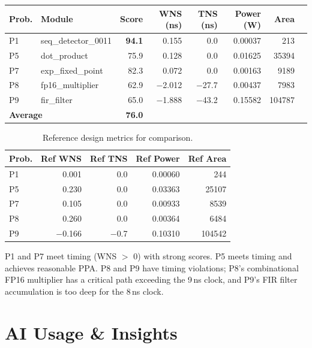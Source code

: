 \documentclass[10pt]{article}
\begin{document}
\begin{table}[h]
\centering
\small
\begin{tabular}{llrrrrrr}
\toprule
\textbf{Prob.} & \textbf{Module} & \textbf{Score} & \textbf{WNS (ns)} & \textbf{TNS (ns)} & \textbf{Power (W)} & \textbf{Area} \\
\midrule
P1 & seq\_detector\_0011  & \textbf{94.1} & 0.155  &  0.0  & 0.00037 & 213 \\
P5 & dot\_product         & 75.9          & 0.128  &  0.0  & 0.01625 & 35394 \\
P7 & exp\_fixed\_point    & 82.3          & 0.072  &  0.0  & 0.00163 & 9189 \\
P8 & fp16\_multiplier     & 62.9          & $-$2.012 & $-$27.7 & 0.00437 & 7983 \\
P9 & fir\_filter          & 65.0          & $-$1.888 & $-$43.2 & 0.15582 & 104787 \\
\midrule
\multicolumn{2}{l}{\textbf{Average}} & \textbf{76.0} & & & & \\
\bottomrule
\end{tabular}
\end{table}

\begin{table}[h]
\centering
\small
\begin{tabular}{lrrrr}
\toprule
\textbf{Prob.} & \textbf{Ref WNS} & \textbf{Ref TNS} & \textbf{Ref Power} & \textbf{Ref Area} \\
\midrule
P1 & 0.001 & 0.0 & 0.00060 & 244 \\
P5 & 0.230 & 0.0 & 0.03363 & 25107 \\
P7 & 0.105 & 0.0 & 0.00933 & 8539 \\
P8 & 0.260 & 0.0 & 0.00364 & 6484 \\
P9 & $-$0.166 & $-$0.7 & 0.10310 & 104542 \\
\bottomrule
\end{tabular}
\caption{Reference design metrics for comparison.}
\end{table}

P1 and P7 meet timing (WNS $>$ 0) with strong scores. P5 meets timing and achieves reasonable PPA. P8 and P9 have timing violations; P8's combinational FP16 multiplier has a critical path exceeding the 9\,ns clock, and P9's FIR filter accumulation is too deep for the 8\,ns clock.

\section{AI Usage \& Insights}
\end{document}
